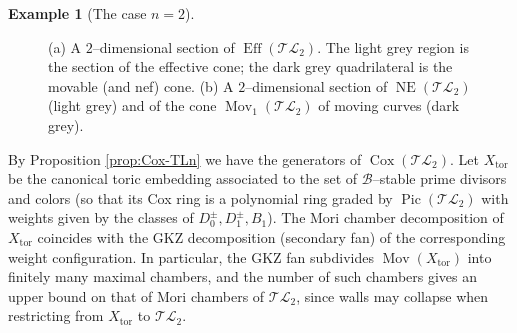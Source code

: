\documentclass[10pt]{amsart}
\theoremstyle{definition}
\newtheorem{example}[theorem]{Example}
\newcommand{\Pic}{\operatorname{Pic}}
\newcommand{\Eff}{\operatorname{Eff}}
\newcommand{\Mov}{\operatorname{Mov}}
\DeclareMathOperator{\Cox}{Cox}
\DeclareMathOperator{\NE}{NE}
\newcommand{\TL}{\mathcal{TL}}
\theoremstyle{plain} %
\begin{document}
\begin{example}[The case $n=2$]
\begin{figure}[ht]
\begin{subfigure}[b]{0.48\textwidth}
\caption{}
\label{fig:sub2}
\end{subfigure}
\caption{(a) A $2$--dimensional section of $\Eff(\TL_2)$. The light grey region is the section of the effective cone; the dark grey quadrilateral is the movable (and nef) cone. (b) A $2$--dimensional section of $\NE(\TL_2)$ (light grey) and of the cone $\Mov_1(\TL_2)$ of moving curves (dark grey).}
\label{fig:combined}
\end{figure}

By Proposition \ref{prop:Cox-TLn} we have the generators of $\Cox(\TL_2)$. Let $X_{\mathrm{tor}}$ be the canonical toric embedding associated to the set of
$\mathscr{B}$--stable prime divisors and colors (so that its Cox ring is a polynomial ring
graded by $\Pic(\TL_2)$ with weights given by the classes of
$D_0^\pm,D_1^\pm,B_1$).
The Mori chamber decomposition of $X_{\mathrm{tor}}$ coincides with the GKZ
decomposition (secondary fan) of the corresponding weight configuration.
In particular, the GKZ fan subdivides $\Mov(X_{\mathrm{tor}})$ into finitely
many maximal chambers, and the number of such chambers gives an upper bound on that of Mori chambers of $\TL_2$, since walls may collapse when restricting
from $X_{\mathrm{tor}}$ to $\TL_2$.


\end{example}
\end{document}
